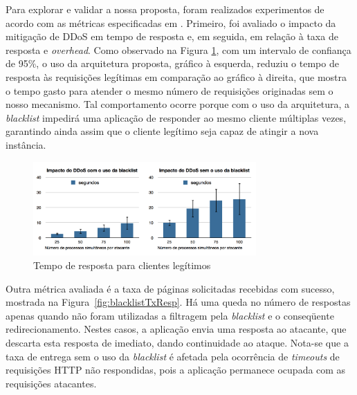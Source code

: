 


Para explorar e validar a nossa proposta, foram realizados experimentos de acordo com as métricas especificadas em \cite{4600003}. Primeiro, foi avaliado o impacto da mitigação de DDoS em tempo de resposta e, em seguida, em relação à taxa de resposta e \emph{overhead}. 
%
%
Como observado na Figura \ref{fig:blacklistSecs}, com um intervalo de confiança de 95\%, o uso da arquitetura proposta, gráfico à esquerda, reduziu o tempo de resposta às requisições legítimas em comparação ao gráfico à direita, que mostra o tempo gasto para atender o mesmo número de requisições originadas sem o nosso mecanismo. Tal comportamento ocorre porque com o uso da arquitetura, a \emph{blacklist} impedirá uma aplicação de responder ao mesmo cliente múltiplas vezes, garantindo ainda assim que o cliente legítimo seja capaz de atingir a nova instância.

\begin{figure}[h!]
\centering
\includegraphics[width=0.76\textwidth]{images/blacklistSecs.png}
\caption{Tempo de resposta para clientes legítimos}
\label{fig:blacklistSecs}
\end{figure}




Outra métrica avaliada é a taxa de páginas solicitadas recebidas com sucesso, mostrada na Figura~\ref{fig:blacklistTxResp}. Há uma queda no número de respostas apenas quando não foram utilizadas a filtragem pela \emph{blacklist} e o conseqüente redirecionamento. Nestes casos, a aplicação envia uma resposta ao atacante, que descarta esta resposta de imediato, dando continuidade ao ataque. Nota-se que a taxa de entrega sem o uso da \emph{blacklist} é afetada pela ocorrência de \emph{timeouts} de requisições HTTP não respondidas, pois a aplicação permanece ocupada com as requisições atacantes.


